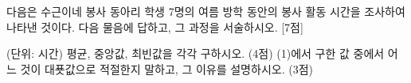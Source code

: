 다음은 수근이네 봉사 동아리 학생 7명의 여름 방학 동안의 봉사 활동 시간을 조사하여 나타낸 것이다. 다음 물음에 답하고, 그 과정을 서술하시오. \mbox{[7점]}\par\noindent\hfill{\footnotesize (단위: 시간)}
 평균, 중앙값, 최빈값을 각각 구하시오. (4점)
 (1)에서 구한 값 중에서 어느 것이 대푯값으로 적절한지 말하고, 그 이유를 설명하시오. (3점)
